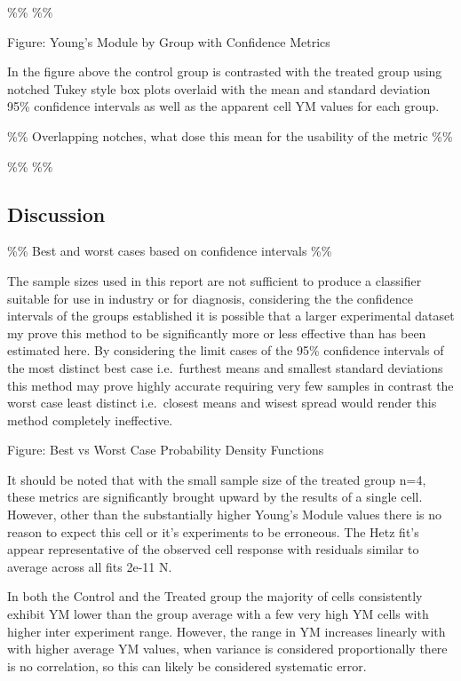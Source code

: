 \documentclass[
  paper=a4,
  ,captions=tableheading
]{scrartcl}
\begin{document}
{} \%\% {} \%\%

Figure: Young's Module by Group with Confidence Metrics

{}

In the figure above the control group is contrasted with the treated
group using notched Tukey style box plots overlaid with the mean and
standard deviation 95\% confidence intervals as well as the apparent
cell YM values for each group.

\%\% Overlapping notches, what dose this mean for the usability of the
metric \%\%

\%\% {} \%\%

\subsection{Discussion}\label{discussion}

\%\% Best and worst cases based on confidence intervals \%\%

The sample sizes used in this report are not sufficient to produce a
classifier suitable for use in industry or for diagnosis, considering
the the confidence intervals of the groups established it is possible
that a larger experimental dataset my prove this method to be
significantly more or less effective than has been estimated here. By
considering the limit cases of the 95\% confidence intervals of the most
distinct best case i.e.~furthest means and smallest standard deviations
this method may prove highly accurate requiring very few samples in
contrast the worst case least distinct i.e.~closest means and wisest
spread would render this method completely ineffective.

Figure: Best vs Worst Case Probability Density Functions

{}

It should be noted that with the small sample size of the treated group
n=4, these metrics are significantly brought upward by the results of a
single cell. However, other than the substantially higher Young's Module
values there is no reason to expect this cell or it's experiments to be
erroneous. The Hetz fit's appear representative of the observed cell
response with residuals similar to average across all fits 2e-11 N.

In both the Control and the Treated group the majority of cells
consistently exhibit YM lower than the group average with a few very
high YM cells with higher inter experiment range. However, the range in
YM increases linearly with with higher average YM values, when variance
is considered proportionally there is no correlation, so this can likely
be considered systematic error.
\end{document}
